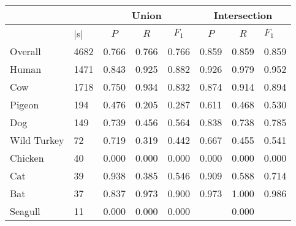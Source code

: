 \begin{table}[t]
\begin{tabular}{llllllll}
\cline{3-8}
                                  & \multicolumn{1}{c|}{}             & \multicolumn{3}{c|}{Union}                 & \multicolumn{3}{c|}{Intersection}          \\ \hline
\multicolumn{1}{|l|}{\Spec{}} & \multicolumn{1}{l|}{$|$\Isol{}s$|$} & \multicolumn{1}{c|}{$P$}   & \multicolumn{1}{c|}{$R$}   & \multicolumn{1}{c|}{$F_1$} & \multicolumn{1}{c|}{$P$}   & \multicolumn{1}{c|}{$R$}   & \multicolumn{1}{l|}{$F_1$} \\ \hline
\multicolumn{1}{|l|}{Overall}     & \multicolumn{1}{l|}{4682}         & 0.766 & 0.766 & \multicolumn{1}{l|}{0.766} & 0.859 & 0.859 & \multicolumn{1}{l|}{0.859} \\
\multicolumn{1}{|l|}{Human}       & \multicolumn{1}{l|}{1471}         & 0.843 & 0.925 & \multicolumn{1}{l|}{0.882} & 0.926 & 0.979 & \multicolumn{1}{l|}{0.952} \\
\multicolumn{1}{|l|}{Cow}         & \multicolumn{1}{l|}{1718}         & 0.750 & 0.934 & \multicolumn{1}{l|}{0.832} & 0.874 & 0.914 & \multicolumn{1}{l|}{0.894} \\
\multicolumn{1}{|l|}{Pigeon}      & \multicolumn{1}{l|}{194}          & 0.476 & 0.205 & \multicolumn{1}{l|}{0.287} & 0.611 & 0.468 & \multicolumn{1}{l|}{0.530} \\
\multicolumn{1}{|l|}{Dog}         & \multicolumn{1}{l|}{149}          & 0.739 & 0.456 & \multicolumn{1}{l|}{0.564} & 0.838 & 0.738 & \multicolumn{1}{l|}{0.785} \\
\multicolumn{1}{|l|}{Wild Turkey} & \multicolumn{1}{l|}{72}           & 0.719 & 0.319 & \multicolumn{1}{l|}{0.442} & 0.667 & 0.455 & \multicolumn{1}{l|}{0.541} \\
\multicolumn{1}{|l|}{Chicken}     & \multicolumn{1}{l|}{40}           & 0.000 & 0.000 & \multicolumn{1}{l|}{0.000} & 0.000 & 0.000 & \multicolumn{1}{l|}{0.000} \\
\multicolumn{1}{|l|}{Cat}         & \multicolumn{1}{l|}{39}           & 0.938 & 0.385 & \multicolumn{1}{l|}{0.546} & 0.909 & 0.588 & \multicolumn{1}{l|}{0.714} \\
\multicolumn{1}{|l|}{Bat}         & \multicolumn{1}{l|}{37}           & 0.837 & 0.973 & \multicolumn{1}{l|}{0.900} & 0.973 & 1.000 & \multicolumn{1}{l|}{0.986} \\
\multicolumn{1}{|l|}{Seagull}     & \multicolumn{1}{l|}{11}           & 0.000 & 0.000 & \multicolumn{1}{l|}{0.000} &    & 0.000 & \multicolumn{1}{l|}{}   \\ \hline
\end{tabular}
\end{table}